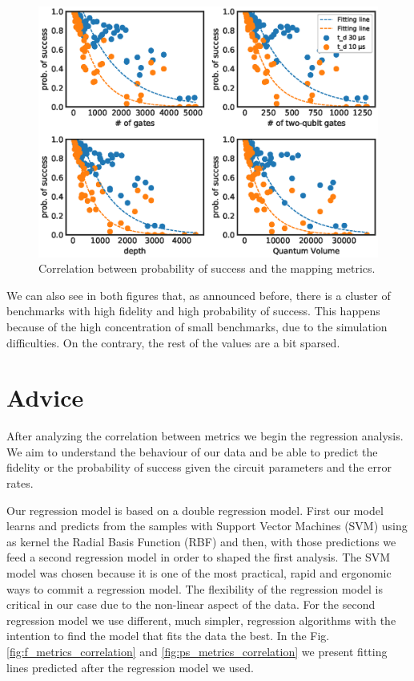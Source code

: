 \begin{figure}[htbp]
\centering
\includegraphics[width=\textwidth]{figures/ps_metrics_correlation.eps}
\caption{\label{fig:orge0389c3}
Correlation between probability of success and the mapping metrics.}
\end{figure}

We can also see in both figures that, as announced before, there is a cluster of benchmarks with high fidelity and high probability of success.
This happens because of the high concentration of small benchmarks, due to the simulation difficulties.
On the contrary, the rest of the values are a bit sparsed.

\section{Advice}
\label{sec:org6b8bcff}
After analyzing the correlation between metrics we begin the regression analysis.
We aim to understand the behaviour of our data and be able to predict the fidelity or the probability of success given the circuit parameters and the error rates.

Our regression model is based on a double regression model.
First our model learns and predicts from the samples with Support Vector Machines (SVM) using as kernel the Radial Basis Function (RBF) and then, with those predictions we feed a second regression model in order to shaped the first analysis.
The SVM model was chosen because it is one of the most practical, rapid and ergonomic ways to commit a regression model.
The flexibility of the regression model is critical in our case due to the non-linear aspect of the data.
For the second regression model we use different, much simpler, regression algorithms with the intention to find the model that fits the data the best.
In the Fig. \ref{fig:f_metrics_correlation} and \ref{fig:ps_metrics_correlation} we present fitting lines predicted after the regression model we used.

